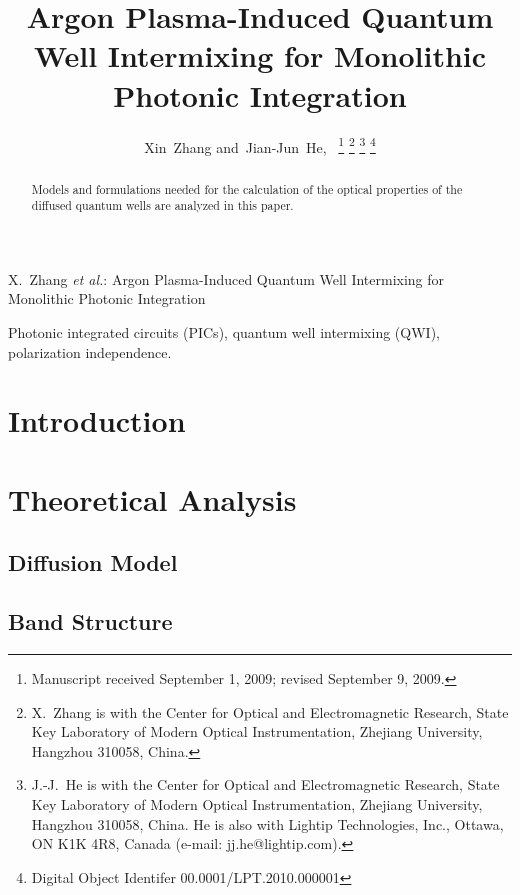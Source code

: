 \documentclass[10pt,final,journal,a4paper,twoside,twocolomn]{IEEEtran}
\begin{document}
\title{Argon Plasma-Induced Quantum Well Intermixing for
       Monolithic Photonic Integration}
\author{Xin~Zhang
        and~Jian-Jun~He,~
\thanks{Manuscript received September 1, 2009; revised September 9, 2009.}
\thanks{X.~Zhang is with
        the Center for Optical and Electromagnetic Research,
        State Key Laboratory of Modern Optical Instrumentation,
        Zhejiang University, Hangzhou 310058, China.}
\thanks{J.-J.~He is with
        the Center for Optical and Electromagnetic Research,
        State Key Laboratory of Modern Optical Instrumentation,
        Zhejiang University, Hangzhou 310058, China.
        He is also with Lightip Technologies, Inc., Ottawa,
        ON K1K 4R8, Canada (e-mail: jj.he@lightip.com).}
\thanks{Digital Object Identifer 00.0001/LPT.2010.000001}}
         {X.~Zhang \MakeLowercase{\textit{et al.}}:
         Argon Plasma-Induced Quantum Well Intermixing for Monolithic Photonic Integration}
 \maketitle
\begin{abstract}
Models and formulations needed for the calculation of the optical
properties of the diffused quantum wells are analyzed in this paper.
\end{abstract}
\begin{IEEEkeywords}
Photonic integrated circuits (PICs), quantum well intermixing (QWI),
polarization independence.
\end{IEEEkeywords}
\section{Introduction}


\section{Theoretical Analysis}
\subsection{Diffusion Model}

\subsection{Band Structure}

\end{document}
